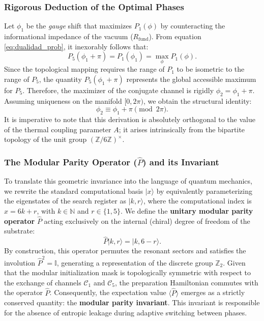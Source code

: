 \documentclass[12pt,a4paper]{article}
\theoremstyle{plain}
\theoremstyle{definition}
\theoremstyle{remark}
\begin{document}
\subsubsection*{Rigorous Deduction of the Optimal Phases}

Let $\phi_1$ be the \textit{gauge} shift that maximizes $P_1(\phi)$ by counteracting the informational impedance of the vacuum ($R_{\text{fund}}$). From equation \eqref{eq:dualidad_prob}, it inexorably follows that:
\begin{equation}
P_5(\phi_1+\pi) = P_1(\phi_1) = \max_{\phi} P_1(\phi).
\end{equation}
Since the topological mapping requires the range of $P_1$ to be isometric to the range of $P_5$, the quantity $P_5(\phi_1+\pi)$ represents the global accessible maximum for $P_5$. Therefore, the maximizer of the conjugate channel is rigidly $\phi_2 = \phi_1 + \pi$. Assuming uniqueness on the manifold $[0, 2\pi)$, we obtain the structural identity:
\begin{equation}
\phi_2 \equiv \phi_1 + \pi \pmod{2\pi}.
\label{eq:relacion_fases}
\end{equation}
It is imperative to note that this derivation is absolutely orthogonal to the value of the thermal coupling parameter $A$; it arises intrinsically from the bipartite topology of the unit group $(\mathbb{Z}/6\mathbb{Z})^{\times}$.

\subsubsection*{The Modular Parity Operator ($\hat{P}$) and its Invariant}

To translate this geometric invariance into the language of quantum mechanics, we rewrite the standard computational basis $|x\rangle$ by equivalently parameterizing the eigenstates of the search register as $|k, r\rangle$, where the computational index is $x = 6k + r$, with $k \in \mathbb{N}$ and $r \in \{1, 5\}$. We define the \textbf{unitary modular parity operator} $\hat{P}$ acting exclusively on the internal (chiral) degree of freedom of the substrate:
\begin{equation}
\hat{P} |k, r\rangle = |k, 6-r\rangle.
\end{equation}
By construction, this operator permutes the resonant sectors and satisfies the involution $\hat{P}^2 = \mathbb{I}$, generating a representation of the discrete group $\mathbb{Z}_2$. Given that the modular initialization mask is topologically symmetric with respect to the exchange of channels $\mathcal{C}_1$ and $\mathcal{C}_5$, the preparation Hamiltonian commutes with the operator $\hat{P}$. Consequently, the expectation value $\langle \hat{P} \rangle$ emerges as a strictly conserved quantity: the \textbf{modular parity invariant}. This invariant is responsible for the absence of entropic leakage during adaptive switching between phases.
\end{document}
